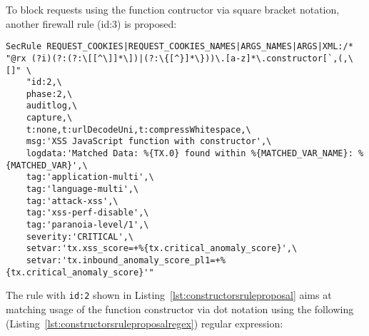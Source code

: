 To block requests using the function contructor via square bracket notation, another firewall rule (id:3) is proposed:

\begin{lstlisting}[style=basicStyle, caption=rule proposal to block usage of function constructor via square bracket notation, label={lst:constructorsruleproposalB}]
SecRule REQUEST_COOKIES|REQUEST_COOKIES_NAMES|ARGS_NAMES|ARGS|XML:/* "@rx (?i)(?:(?:\[[^\]]*\])|(?:\{[^}]*\}))\.[a-z]*\.constructor[`,(,\[]" \
    "id:2,\
    phase:2,\
    auditlog,\
    capture,\
    t:none,t:urlDecodeUni,t:compressWhitespace,\
    msg:'XSS JavaScript function with constructor',\
    logdata:'Matched Data: %{TX.0} found within %{MATCHED_VAR_NAME}: %{MATCHED_VAR}',\
    tag:'application-multi',\
    tag:'language-multi',\
    tag:'attack-xss',\
    tag:'xss-perf-disable',\
    tag:'paranoia-level/1',\
    severity:'CRITICAL',\
    setvar:'tx.xss_score=+%{tx.critical_anomaly_score}',\
    setvar:'tx.inbound_anomaly_score_pl1=+%{tx.critical_anomaly_score}'"
\end{lstlisting}

The rule with \verb|id:2| shown in Listing~\ref{lst:constructorsruleproposal} aims at matching usage of the function constructor via dot notation using the following (Listing~\ref{lst:constructorsruleproposalregex}) regular expression:

